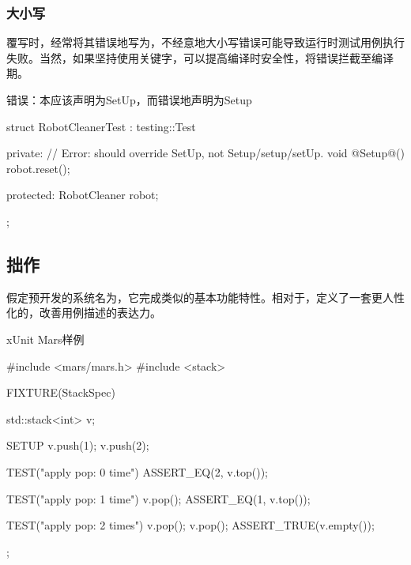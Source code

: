 \begin{content}
\subsubsection{大小写}

覆写时，经常将其错误地写为，不经意地大小写错误可能导致运行时测试用例执行失败。当然，如果坚持使用关键字，可以提高编译时安全性，将错误拦截至编译期。

\begin{nodiff}{错误：本应该声明为SetUp，而错误地声明为Setup}
 \begin{c++}
struct RobotCleanerTest : testing::Test {
private:
  // Error: should override SetUp, not Setup/setup/setUp.
  void @Setup@() {
    robot.reset();
  }
 
protected:
  RobotCleaner robot;
};
  \end{c++}
\end{nodiff}

\subsection{拙作}

假定预开发的系统名为，它完成类似的基本功能特性。相对于，定义了一套更人性化的，改善用例描述的表达力。

\begin{enum}
\end{enum}

\begin{nodiff}{xUnit Mars样例}
 \begin{c++}
#include <mars/mars.h>
#include <stack>

FIXTURE(StackSpec) {
  std::stack<int> v;   

  SETUP {
    v.push(1);
    v.push(2);
  }

  TEST("apply pop: 0 time") {
    ASSERT_EQ(2, v.top());
  }

  TEST("apply pop: 1 time") {
    v.pop();
    ASSERT_EQ(1, v.top());
  }

  TEST("apply pop: 2 times") {
    v.pop();
    v.pop();
    ASSERT_TRUE(v.empty());
  }
}; 
 \end{c++}
\end{nodiff}

\end{content}

